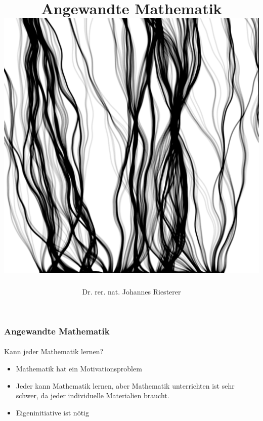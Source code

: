\documentclass{beamer}
\begin{document}
\title[Angewandte Mathematik] %
{Angewandte Mathematik
\\
\includegraphics[scale=0.15]{images/cover}
}
\subtitle{}
\author[Dr. Johannes Riesterer] %
{Dr.  rer. nat. Johannes Riesterer}

\date[KPT 2004] %
{}

\subject{Angewandte Mathematik}

\frame{\titlepage}

\begin{frame}
    \frametitle{Angewandte Mathematik}
\framesubtitle{}
    \begin{block}{Kann jeder Mathematik lernen?}
\begin{itemize}
\pause \item Mathematik hat ein Motivationsproblem
\pause \item Jeder kann Mathematik lernen, aber Mathematik unterrichten ist sehr schwer, da jeder individuelle Materialien braucht.
\pause \item Eigeninitiative ist nötig

\end{itemize}
\end{block}

 \end{frame}
\end{document}
